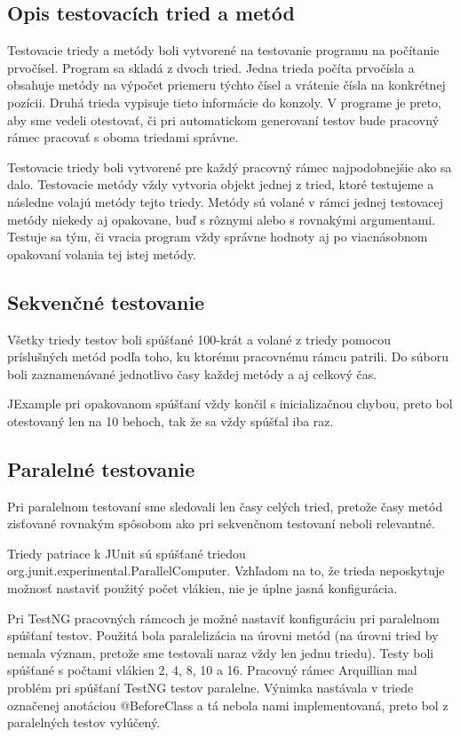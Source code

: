 \documentclass[11pt,twoside,slovak,a4paper]{article}
\begin{document}
	\subsection{Opis testovacích tried a metód}
	Testovacie triedy a metódy boli vytvorené na testovanie programu na počítanie prvočísel. Program sa skladá z dvoch tried. Jedna trieda počíta prvočísla a obsahuje metódy na výpočet priemeru týchto čísel a vrátenie čísla na konkrétnej pozícii. Druhá trieda vypisuje tieto informácie do konzoly. V programe je preto, aby sme vedeli otestovať, či pri automatickom generovaní testov bude pracovný rámec pracovať s oboma triedami správne.
	
	Testovacie triedy boli vytvorené pre každý pracovný rámec najpodobnejšie ako sa dalo. Testovacie metódy vždy vytvoria objekt jednej z tried, ktoré testujeme a následne volajú metódy tejto triedy. Metódy sú volané v rámci jednej testovacej metódy niekedy aj opakovane, buď s rôznymi alebo s rovnakými argumentami. Testuje sa tým, či vracia program vždy správne hodnoty aj po viacnásobnom opakovaní volania tej istej metódy.
	
	
	\subsection{Sekvenčné testovanie}
	Všetky triedy testov boli spúšťané 100-krát a volané z triedy pomocou príslušných metód podľa toho, ku ktorému pracovnému rámcu patrili. Do súboru boli zaznamenávané jednotlivo časy každej metódy a aj celkový čas.
	
	JExample pri opakovanom spúšťaní vždy končil s inicializačnou chybou, preto bol otestovaný len na 10 behoch, tak že sa vždy spúšťal iba raz.
	
	\subsection{Paralelné testovanie}
	Pri paralelnom testovaní sme sledovali len časy celých tried, pretože časy metód zisťované rovnakým spôsobom ako pri sekvenčnom testovaní neboli relevantné.
	
	Triedy patriace k JUnit sú spúšťané triedou org.junit.experimental.ParallelComputer. Vzhľadom na to, že trieda neposkytuje možnosť nastaviť použitý počet vlákien, nie je úplne jasná konfigurácia.
	
	Pri TestNG pracovných rámcoch je možné nastaviť konfiguráciu pri paralelnom spúšťaní testov. Použitá bola paralelizácia na úrovni metód (na úrovni tried by nemala význam, pretože sme testovali naraz vždy len jednu triedu). Testy boli spúšťané s počtami vlákien 2, 4, 8, 10 a 16. Pracovný rámec Arquillian mal problém pri spúšťaní TestNG testov paralelne. Výnimka nastávala v triede označenej anotáciou @BeforeClass a tá nebola nami implementovaná, preto bol z paralelných testov vylúčený.
	
\end{document}
